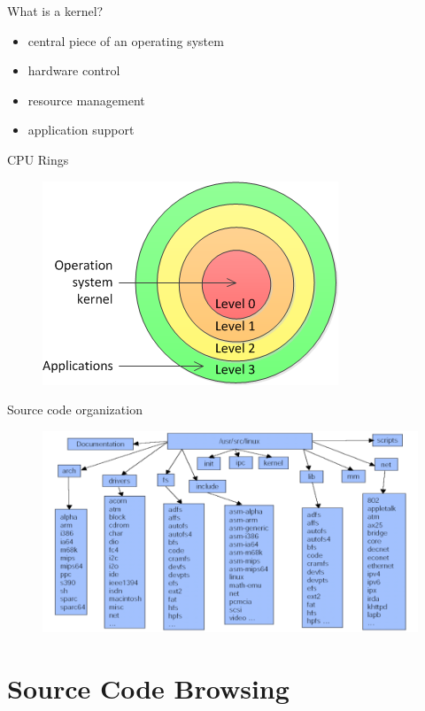 \documentclass{workshop}
\begin{document}
\begin{frame}{What is a kernel?}
	\begin{itemize}
	\item central piece of an operating system
	\item hardware control
	\item resource management
	\item application support
	\end{itemize}
\end{frame}

\begin{frame}{CPU Rings}
\begin{figure}
  \includegraphics[scale=0.8]{img/privilege-level-en.png}
\end{figure}
\end{frame}

\begin{frame}{Source code organization}

\begin{figure}
  \includegraphics[scale=0.3]{img/source-org.png}
\end{figure}

\end{frame}

\section{Source Code Browsing}
\end{document}
